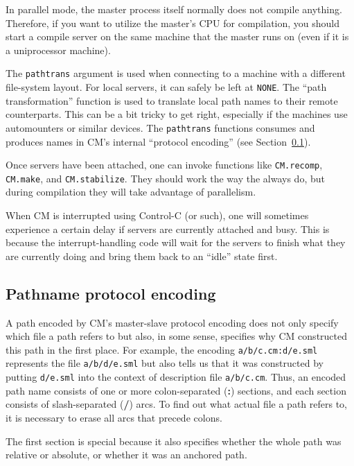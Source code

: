 \documentclass[titlepage,letterpaper]{article}
\begin{document}
In parallel mode, the master process itself normally does not compile
anything.  Therefore, if you want to utilize the master's CPU for
compilation, you should start a compile server on the same machine
that the master runs on (even if it is a uniprocessor machine).

The {\tt pathtrans} argument is used when connecting to a machine with
a different file-system layout.  For local servers, it can safely be
left at {\tt NONE}.  The ``path transformation'' function is used to
translate local path names to their remote counterparts.  This can be
a bit tricky to get right, especially if the machines use automounters
or similar devices.  The {\tt pathtrans} functions consumes and
produces names in CM's internal ``protocol encoding'' (see
Section~\ref{sec:pathencode}).

Once servers have been attached, one can invoke functions like
{\tt CM.recomp}, {\tt CM.make}, and {\tt CM.stabilize}.  They should
work the way the always do, but during compilation they will take
advantage of parallelism.

When CM is interrupted using Control-C (or such), one will sometimes
experience a certain delay if servers are currently attached and busy.
This is because the interrupt-handling code will wait for the servers
to finish what they are currently doing and bring them back to an
``idle'' state first.

\subsection{Pathname protocol encoding}
\label{sec:pathencode}

A path encoded by CM's master-slave protocol encoding does not only
specify which file a path refers to but also, in some sense, specifies
why CM constructed this path in the first place.  For example, the
encoding {\tt a/b/c.cm:d/e.sml} represents the file {\tt a/b/d/e.sml}
but also tells us that it was constructed by putting {\tt d/e.sml}
into the context of description file {\tt a/b/c.cm}.  Thus, an encoded
path name consists of one or more colon-separated ({\bf :}) sections,
and each section consists of slash-separated ({\bf /}) arcs.  To find
out what actual file a path refers to, it is necessary to erase all
arcs that precede colons.

The first section is special because it also specifies whether the
whole path was relative or absolute, or whether it was an anchored
path.
\end{document}
